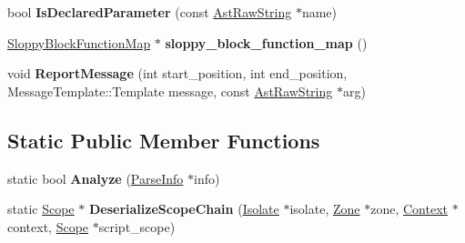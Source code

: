 \begin{DoxyCompactItemize}
\item 
bool {\bfseries Is\+Declared\+Parameter} (const \hyperlink{classv8_1_1internal_1_1_ast_raw_string}{Ast\+Raw\+String} $\ast$name)\hypertarget{classv8_1_1internal_1_1_scope_a3a10bf4689c0d34aa080dc9882de0801}{}\label{classv8_1_1internal_1_1_scope_a3a10bf4689c0d34aa080dc9882de0801}

\item 
\hyperlink{classv8_1_1internal_1_1_sloppy_block_function_map}{Sloppy\+Block\+Function\+Map} $\ast$ {\bfseries sloppy\+\_\+block\+\_\+function\+\_\+map} ()\hypertarget{classv8_1_1internal_1_1_scope_a48cfd0b55cd50bec8e4776a8066b34a4}{}\label{classv8_1_1internal_1_1_scope_a48cfd0b55cd50bec8e4776a8066b34a4}

\item 
void {\bfseries Report\+Message} (int start\+\_\+position, int end\+\_\+position, Message\+Template\+::\+Template message, const \hyperlink{classv8_1_1internal_1_1_ast_raw_string}{Ast\+Raw\+String} $\ast$arg)\hypertarget{classv8_1_1internal_1_1_scope_a65cdcf88aea8eeb2a7867fb26b500f90}{}\label{classv8_1_1internal_1_1_scope_a65cdcf88aea8eeb2a7867fb26b500f90}

\end{DoxyCompactItemize}
\subsection*{Static Public Member Functions}
\begin{DoxyCompactItemize}
\item 
static bool {\bfseries Analyze} (\hyperlink{classv8_1_1internal_1_1_parse_info}{Parse\+Info} $\ast$info)\hypertarget{classv8_1_1internal_1_1_scope_addc8927ffddf4c5581b69aa286679832}{}\label{classv8_1_1internal_1_1_scope_addc8927ffddf4c5581b69aa286679832}

\item 
static \hyperlink{classv8_1_1internal_1_1_scope}{Scope} $\ast$ {\bfseries Deserialize\+Scope\+Chain} (\hyperlink{classv8_1_1internal_1_1_isolate}{Isolate} $\ast$isolate, \hyperlink{classv8_1_1internal_1_1_zone}{Zone} $\ast$zone, \hyperlink{classv8_1_1internal_1_1_context}{Context} $\ast$context, \hyperlink{classv8_1_1internal_1_1_scope}{Scope} $\ast$script\+\_\+scope)\hypertarget{classv8_1_1internal_1_1_scope_a2c5484c5486eecc51215bc844a36b098}{}\label{classv8_1_1internal_1_1_scope_a2c5484c5486eecc51215bc844a36b098}

\end{DoxyCompactItemize}
